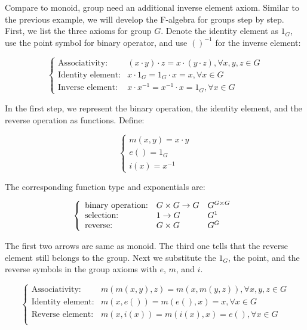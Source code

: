 \documentclass[b5paper]{article}
\begin{document}
\begin{example}
\normalfont
Compare to monoid, group need an additional inverse element axiom. Similar to the previous example, we will develop the F-algebra for groups step by step. First, we list the three axioms for group $G$. Denote the identity element as $1_G$, use the point symbol for binary operator, and use $()^{-1}$ for the inverse element:

\[
\begin{cases}
\text{Associativity:} & (x \cdot y) \cdot z = x \cdot (y \cdot z), \forall x, y, z \in G \\
\text{Identity element:} & x \cdot 1_G = 1_G \cdot x = x, \forall x \in G \\
\text{Inverse element:} & x \cdot x^{-1} = x^{-1} \cdot x = 1_G, \forall x \in G
\end{cases}
\]

In the first step, we represent the binary operation, the identity element, and the reverse operation as functions. Define:

\[
\begin{cases}
m (x, y) = x \cdot y \\
e () = 1_G \\
i (x) = x^{-1}
\end{cases}
\]

The corresponding function type and exponentials are:

\[
  \left \{
    \begin{array}{lll}
      \text{binary operation:} & G \times G \to G & G^{G \times G}\\
      \text{selection:} & 1 \to G & G^1 \\
      \text{reverse:} & G \times G & G^G \\
    \end{array}
  \right . \\
\]

The first two arrows are same as monoid. The third one tells that the reverse element still belongs to the group. Next we substitute the $1_G$, the point, and the reverse symbols in the group axioms with $e$, $m$, and $i$.

\[
\begin{cases}
\text{Associativity:} & m(m(x, y), z) = m(x, m(y, z)), \forall x, y, z \in G \\
\text{Identity element:} & m(x, e()) = m(e(), x) = x, \forall x \in G \\
\text{Reverse element:} & m(x, i(x)) = m(i(x), x) = e(), \forall x \in G \\
\end{cases}
\]


\end{example}
\end{document}
